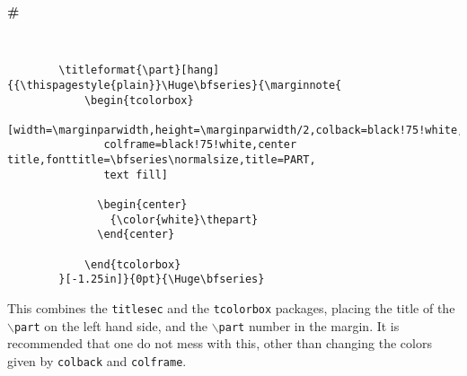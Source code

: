\documentclass[10pt]{article}
\begin{document}
	\begin{fullpage}
	{{\centering
		\begin{tcolorbox}[width=\marginparwidth,height=\marginparwidth/2,colback=black!75!white,colframe=black!75!white,center title,fonttitle=\bfseries\normalsize,title=PART,text fill]
		  \begin{center}
		  {\color{white}\Huge\bfseries\#}
		  \end{center}
		\end{tcolorbox}
	}}
	~ \newline 
	\begin{verbatim}
		\titleformat{\part}[hang]{{\thispagestyle{plain}}\Huge\bfseries}{\marginnote{
			\begin{tcolorbox}
			[width=\marginparwidth,height=\marginparwidth/2,colback=black!75!white,
			   colframe=black!75!white,center title,fonttitle=\bfseries\normalsize,title=PART,
			   text fill]

			  \begin{center}
			  	{\color{white}\thepart}
			  \end{center}

			\end{tcolorbox}
		}[-1.25in]}{0pt}{\Huge\bfseries}
	\end{verbatim}
	\end{fullpage}
	
	This combines the \texttt{titlesec} and the \texttt{tcolorbox} packages, placing the title of the \texttt{$\backslash$part} on the left hand side, and the \texttt{$\backslash$part} number in the margin. It is recommended that one do not mess with this, other than changing the colors given by \texttt{colback} and \texttt{colframe}.
	\newpage
\end{document}
